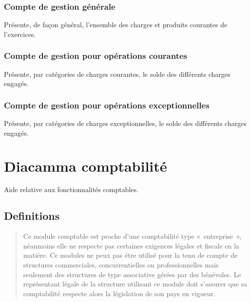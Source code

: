 \documentclass[a4paper,10pt,oneside,french]{sphinxmanual}
\begin{document}
\subsection{Compte de gestion générale}
\label{\detokenize{condominium/report:compte-de-gestion-generale}}
Présente, de façon général, l’ensemble des charges et produits courantes de l’exercices.


\subsection{Compte de gestion pour opérations courantes}
\label{\detokenize{condominium/report:compte-de-gestion-pour-operations-courantes}}
Présente, par catégories de charges courantes, le solde des différents charges engagés.


\subsection{Compte de gestion pour opérations exceptionnelles}
\label{\detokenize{condominium/report:compte-de-gestion-pour-operations-exceptionnelles}}
Présente, par catégories de charges exceptionnelles, le solde des différents charges engagés.


\chapter{Diacamma comptabilité}
\label{\detokenize{accounting/index:diacamma-comptabilite}}\label{\detokenize{accounting/index::doc}}
Aide relative aux fonctionnalités comptables.


\section{Definitions}
\label{\detokenize{accounting/definition:definitions}}\label{\detokenize{accounting/definition::doc}}\begin{quote}

 Ce module comptable est proche d’une comptabilité type « entreprise », néanmoins elle ne respecte pas certaines exigences légales et fiscale en la matiére.
Ce modules ne peux pas étre utilisé pour la tenu de compte de structures commerciales, concurrentielles ou professionnelles mais seulement des structures de type associative gérées par des bénévoles.
Le représentant légale de la structure utilisant ce module doit s’assurer que sa comptabilité respecte alors la législation de son pays en vigueur.
\end{quote}
\end{document}
